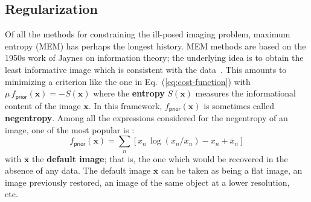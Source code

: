 \documentclass{article}
\newcommand{\vocab}[1]{\textbf{#1}}
\newcommand{\Tag}[1]{\mathsf{#1}}        %
\newcommand{\V}[1]{\boldsymbol{#1}}      %
\newcommand{\M}[1]{\mathbf{#1}}          %
\newcommand{\etc}{etc.\xspace}
\newcommand{\Eq}[1]{Eq.~(\ref{#1})}
\newcommand{\Param}{x}
\newcommand{\VParam}{\V{\Param}}
\newcommand{\PriorTag}{\Tag{prior}}
\newcommand{\Fcost}{f}
\newcommand{\Fprior}{\Fcost_\PriorTag}
\begin{document}

\subsection{Regularization}
\label{sec:regularization}

Of all the methods for constraining the ill-posed imaging problem, maximum
entropy (MEM) has perhaps the longest history. MEM methods are based on the
1950s work of Jaynes on information theory; the underlying idea is to obtain
the least informative image which is consistent with the
data~\citep{Ables-1974-MEM}.  This amounts to minimizing a criterion like the
one in \Eq{eq:cost-function} with $\mu\,\Fprior(\VParam) = -S(\VParam)$ where the
\vocab{entropy} $S(\VParam)$ measures the informational content of the image
$\VParam$.  In this framework, $\Fprior(\VParam)$ is sometimes called
\vocab{negentropy}.  Among all the expressions considered for the negentropy of
an image, one of the most popular is \citep{Gull_Skilling-1984-MEM}:
\begin{equation}
  \label{eq:mem-prior}
  \Fprior(\VParam) = \sum_n \left[
    \Param_n\,\log( \Param_n/\bar{\Param}_n) - \Param_n + \bar{\Param}_n
  \right]
\end{equation}
with $\bar{\VParam}$ the \vocab{default image}; that is, the one which would
be recovered in the absence of any data.  The default image $\bar{\VParam}$
can be taken as being a flat image, an image previously restored, an image of
the same object at a lower resolution, \etc\
\end{document}
